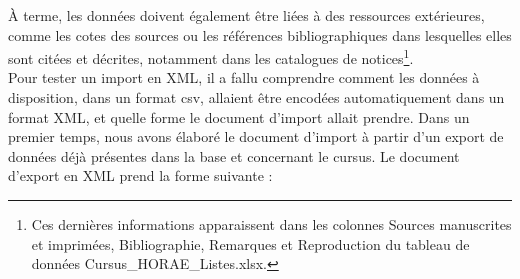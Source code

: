 \documentclass[a4paper,12pt,twoside]{book}
\begin{document}
	À terme, les données doivent également être liées à des ressources extérieures, comme les cotes des sources ou les références bibliographiques dans lesquelles elles sont citées et décrites, notamment dans les catalogues de notices\footnote{Ces dernières informations apparaissent dans les colonnes \og Sources manuscrites et imprimées\fg{}, \og Bibliographie\fg{}, \og Remarques\fg{} et \og Reproduction\fg{} du tableau de données \og Cursus\_HORAE\_Listes.xlsx\fg{}.}. \\
	
	Pour tester un import en XML, il a fallu comprendre comment les données à disposition, dans un format csv, allaient être encodées automatiquement dans un format XML, et quelle forme le document d'import allait prendre. Dans un premier temps, nous avons élaboré le document d'import à partir d'un export de données déjà présentes dans la base et concernant le cursus. Le document d'export en XML prend la forme suivante : 
\end{document}
